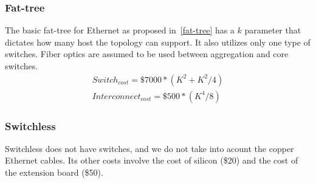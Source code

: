 \subsubsection{Fat-tree}
The basic fat-tree for Ethernet as proposed in~\ref{fat-tree} has a $k$ parameter that dictates how many host the topology can support. It also utilizes only one type of switches. Fiber optics are assumed to be used between aggregation and core switches.
\vspace{-0.1in}
\begin{align}
Switch_{cost} = \$7000 * (K^2 + K^2 / 4) \\
Interconnect_{cost} = \$500 * (K^4 / 8)
\end{align}
\vspace{-0.1in}
\subsubsection{Switchless}
Switchless does not have switches, and we do not take into acount the copper Ethernet cables. Its other costs involve the cost of silicon (\$20) and the cost of the extension board (\$50).
